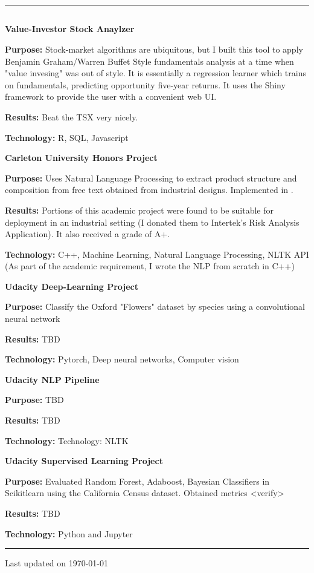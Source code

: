 \documentclass[10pt,a4paper]{article}
\newcommand*\roottitle[1]{\subsection*{#1}\vspace{-0.3em}\nopagebreak[4]}
\newcommand*\acr[1]{\textscale{.85}{#1}}
\newlength{\tripleparindent}
\newcommand{\breakvspace}[1]{\pagebreak[2]\vspace{#1}\pagebreak[2]}
\newcommand{\nobreakvspace}[1]{\nopagebreak[4]\vspace{#1}\nopagebreak[4]}
\newcommand{\spacedhrule}[2]{\breakvspace{#1}\hrule\nobreakvspace{#2}}
\newcommand{\headerone}[1] {\textscale{1.2}{\textbf{#1}}\vspace{0.7em}\nopagebreak[4]}
\newcommand{\headertwo}[1]{\vspace{0.5em}\nopagebreak[4]\textbf{#1}\nopagebreak[4]\vspace{0.1em}} %
\newcommand{\projectLine}[2]{\vspace{-0.4em}\begin{basedescript}{\setlength{\leftmargin}{\tripleparindent}}\item[\hspace{\tripleparindent}\textbf{#1}]#2\end{basedescript}\vspace{-0.5em}}
\begin{document}
 
    
\spacedhrule{1.5em}{-0.4em}


\roottitle{} 
\headerone{Academic Projects}

   \headertwo{Value-Investor Stock Anaylzer}      
   \projectLine{Purpose: }{ Stock-market algorithms are ubiquitous, but I built this tool to apply Benjamin Graham/Warren Buffet Style fundamentals analysis at a time when "value invesing" was out of style.  It is essentially a regression learner which trains on fundamentals, predicting opportunity five-year returns. 
   It uses the Shiny framework to provide the user with a convenient web UI.}
   \projectLine{Results: }{Beat the TSX very nicely.}
   \projectLine{Technology: }{R, SQL, Javascript}

   \headertwo{Carleton University Honors Project} 
   \projectLine{Purpose: }{ Uses Natural Language Processing to extract product structure and composition from free text obtained from industrial designs.  Implemented in \acr{C++}.}
   \projectLine{Results: }{Portions of this academic project were found to be suitable for deployment in an industrial setting (I donated them to Intertek's Risk Analysis Application).  It also received a grade of A+.}
   \projectLine{Technology: }{C++, Machine Learning, Natural Language Processing, NLTK API (As part of the academic requirement, I wrote the NLP from scratch in C++)}
    
   \headertwo{Udacity Deep-Learning Project}  
   \projectLine{Purpose: }{Classify the Oxford "Flowers" dataset by species using a convolutional neural network }
   \projectLine{Results: }{TBD}
   \projectLine{Technology: }{ Pytorch, Deep neural networks, Computer vision}

   \headertwo{Udacity NLP Pipeline} 
   \projectLine{Purpose: }{TBD}
   \projectLine{Results: }{TBD}
   \projectLine{Technology: }{Technology: NLTK}

   \headertwo{Udacity Supervised Learning Project}  
   \projectLine{Purpose: }{Evaluated Random Forest, Adaboost, Bayesian Classifiers in Scikitlearn using the California Census 
dataset.  Obtained metrics <verify>}
   \projectLine{Results: }{TBD}
   \projectLine{Technology: }{Python and Jupyter}
    


\spacedhrule{1.5em}{-0.4em}

\vfill  

{\footnotesize Last updated on \today}
\end{document}
